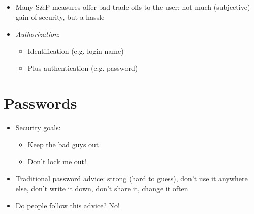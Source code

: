 \documentclass[a4paper,12pt]{scrartcl}
\begin{document}
\begin{itemize}
	\item
		Many S\&P measures offer bad trade-offs to the user: not much (subjective) gain of security, but a hassle
	\item
		\textit{Authorization}: 
		\begin{itemize}
			\item
				Identification (e.g. login name)
			\item
				Plus authentication (e.g. password)
		\end{itemize}
\end{itemize}



\section{Passwords}
\begin{itemize}
	\item
		Security goals:
		\begin{itemize}
			\item
				Keep the bad guys out
			\item
				Don't lock me out!
		\end{itemize}
	\item
		Traditional password advice: strong (hard to guess), don't use it anywhere else, don't write it down, don't share it, change it often
	\item
		Do people follow this advice? No!
\end{itemize}
\end{document}
